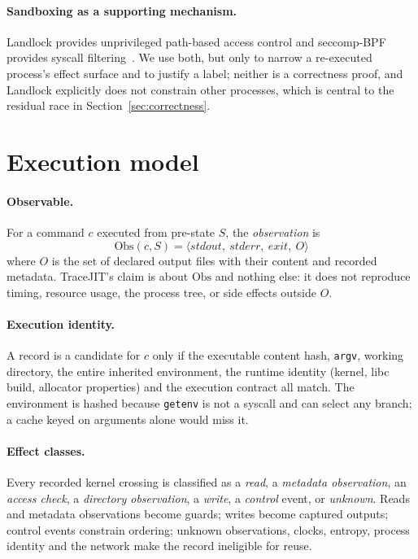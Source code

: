\paragraph{Sandboxing as a supporting mechanism.}
Landlock provides unprivileged path-based access control and seccomp-BPF provides syscall
filtering~\cite{landlock,seccomp}. We use both, but only to narrow a re-executed process's effect
surface and to justify a label; neither is a correctness proof, and Landlock explicitly does not
constrain other processes, which is central to the residual race in Section~\ref{sec:correctness}.

\section{Execution model}
\label{sec:model}

\paragraph{Observable.}
For a command $c$ executed from pre-state $S$, the \emph{observation} is
\[
  \mathrm{Obs}(c, S) = \langle \mathit{stdout},\ \mathit{stderr},\ \mathit{exit},\ O \rangle
\]
where $O$ is the set of declared output files with their content and recorded metadata. TraceJIT's
claim is about $\mathrm{Obs}$ and nothing else: it does not reproduce timing, resource usage, the
process tree, or side effects outside $O$.

\paragraph{Execution identity.}
A record is a candidate for $c$ only if the executable content hash, \texttt{argv}, working
directory, the entire inherited environment, the runtime identity (kernel, libc build, allocator
properties) and the execution contract all match. The environment is hashed because
\texttt{getenv} is not a syscall and can select any branch; a cache keyed on arguments alone would
miss it.

\paragraph{Effect classes.}
Every recorded kernel crossing is classified as a \emph{read}, a \emph{metadata observation}, an
\emph{access check}, a \emph{directory observation}, a \emph{write}, a \emph{control} event, or
\emph{unknown}. Reads and metadata observations become guards; writes become captured outputs;
control events constrain ordering; unknown observations, clocks, entropy, process identity and the
network make the record ineligible for reuse.

